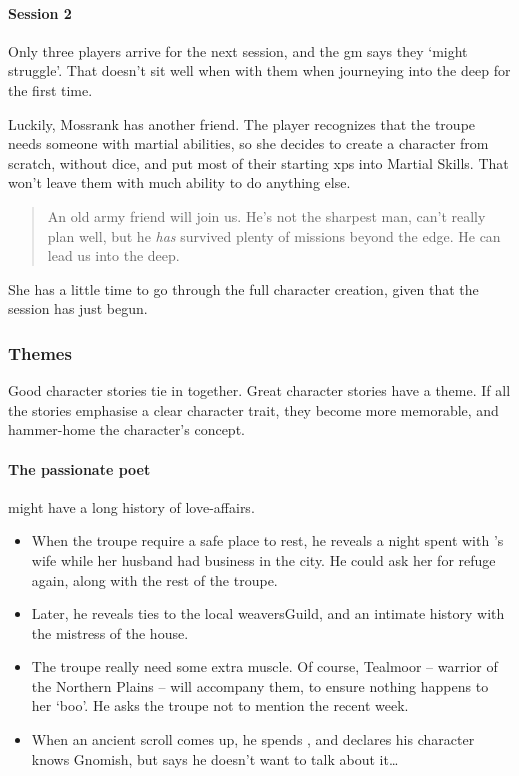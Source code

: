 \begin{multicols}{2}
\begin{exampletext}
\end{exampletext}

\begin{exampletext}
  \paragraph{Session 2}
  Only three players arrive for the next session, and the \gls{gm} says they `might struggle'.
  That doesn't sit well when with them when journeying into the \gls{deep} for the first time.

  Luckily, Mossrank has another friend.
  The player recognizes that the troupe needs someone with martial abilities, so she decides to create a character from scratch, without dice, and put most of their starting \glspl{xp} into Martial Skills.
  That won't leave them with much ability to do anything else.

  \begin{quotation}
    An old army friend will join us.
    He's not the sharpest man, can't really plan well, but he \emph{has} survived plenty of missions beyond the \gls{edge}.
    He can lead us into the \gls{deep}.
  \end{quotation}

  She has a little time to go through the full character creation, given that the session has just begun.
\end{exampletext}

\subsubsection{Themes}

Good character stories tie in together.
Great character stories have a theme.
If all the stories emphasise a clear character trait, they become more memorable, and hammer-home the character's concept.

\paragraph{The passionate poet}
might have a long history of love-affairs.

\begin{itemize}
  \item
  When the troupe require a safe place to rest, he reveals a night spent with 's wife while her husband had business in the city.
  He could ask her for refuge again, along with the rest of the troupe.
  \item
  Later, he reveals ties to the local \gls{weaversGuild}, and an intimate history with the mistress of the house.
  \item
  The troupe really need some extra muscle.
  Of course, Tealmoor -- warrior of the Northern Plains -- will accompany them, to ensure nothing happens to her `boo'.
  He asks the troupe not to mention the recent week.
  \item
  When an ancient scroll comes up, he spends , and declares his character knows Gnomish, but says he doesn't want to talk about it\ldots
\end{itemize}


\end{multicols}
